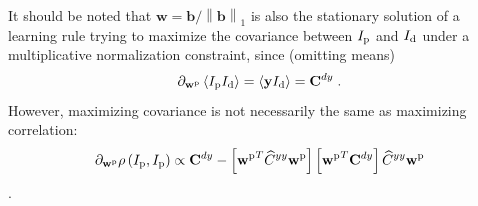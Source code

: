 \documentclass[10pt,a4paper,draft]{article}
\begin{document}
It should be noted that $\mathbf{w} = \mathbf{b} / \left\lVert \mathbf{b} \right\rVert_1$ is also the stationary solution of a learning rule trying to maximize the covariance between $I_{\rm p}$ and $I_{\rm d}$ under a multiplicative normalization constraint, since (omitting means)
\begin{equation}
	\partial_{\mathbf{w}^{\rm p}} \left\langle I_{\rm p}I_{\rm d}\right\rangle = \left\langle \mathbf{y} I_{\rm d} \right\rangle = \mathbf{C}^{dy} \; .
\end{equation}
However, maximizing covariance is not necessarily the same as maximizing correlation:
\begin{equation}
	\partial_{\mathbf{w}^{\rm p}} \rho\left(I_{\rm p},I_{\rm p}\right) \propto \mathbf{C}^{dy} - \left[{\mathbf{w}^{\rm p}}^T \widehat{C}^{yy}{\mathbf{w}^{\rm p}}\right]\left[{\mathbf{w}^{\rm p}}^T \mathbf{C}^{dy} \right] \widehat{C}^{yy}{\mathbf{w}^{\rm p}}
\end{equation} .
%
%
%
\end{document}
